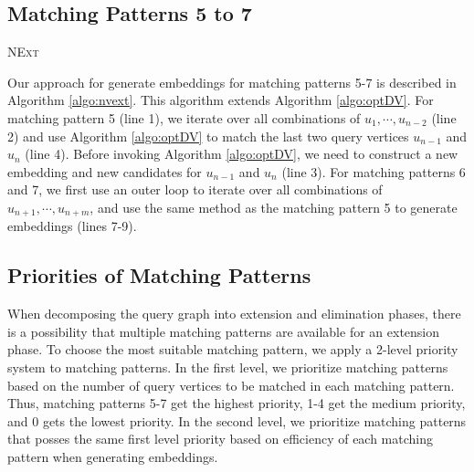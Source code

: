 \subsection{Matching Patterns 5 to 7}
\begin{algorithm}[t!]
	\caption{\textsc{NExt}}
	\label{algo:nvext}
\end{algorithm}

Our approach for generate embeddings for matching patterns 5-7 is described in Algorithm \ref{algo:nvext}. This algorithm extends Algorithm
\ref{algo:optDV}. For matching pattern 5 (line 1), we iterate over all combinations of $u_1, \cdots, u_{n-2}$ (line 2) and use Algorithm
\ref{algo:optDV} to match the last two query vertices $u_{n-1}$ and $u_n$ (line 4). Before invoking Algorithm \ref{algo:optDV}, we need to
construct a new embedding and new candidates for $u_{n-1}$ and $u_n$ (line 3). For matching patterns 6 and 7, we first use an outer loop to
iterate over all combinations of $u_{n+1}, \cdots, u_{n+m}$, and use the same method as the matching pattern 5 to generate embeddings
(lines 7-9).


\subsection{Priorities of Matching Patterns\label{sec:spm}}
When decomposing the query graph into extension and elimination phases, there is a possibility that multiple matching patterns are
available for an extension phase. To choose the most suitable matching pattern, we apply a 2-level priority system to matching patterns. In
the first level, we prioritize matching patterns based on the number of query vertices to be matched in each matching pattern. Thus,
matching patterns 5-7 get the highest priority, 1-4 get the medium priority, and 0 gets the lowest priority. In the second level, we
prioritize matching patterns that posses the same first level priority based on efficiency of each matching pattern when generating
embeddings.

